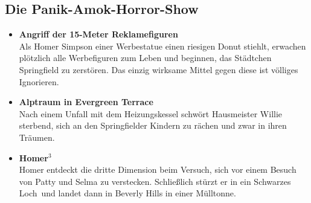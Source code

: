 	
\subsection{Die Panik-Amok-Horror-Show}\label{3F04}
\begin{itemize}
	\item \textbf{Angriff der 15-Meter Reklamefiguren}\\ Als Homer Simpson einer Werbestatue einen riesigen Donut stiehlt, erwachen plötzlich alle Werbefiguren zum Leben und beginnen, das Städt\-chen Springfield zu zerstören. Das einzig wirksame Mittel gegen diese ist völliges Ignorieren.
	\item \textbf{Alptraum in Evergreen Terrace}\\  Nach einem Unfall mit dem Heizungskessel schwört Hausmeister Willie sterbend, sich an den Springfielder Kindern zu rächen und zwar in ihren Träumen.
	\item \textbf{Homer$^3$}\\ Homer entdeckt die dritte Dimension beim Versuch, sich vor einem Besuch von Patty und Selma zu verstecken. Schließlich stürzt er in ein \glqq Schwarzes Loch\grqq\ und landet dann in Beverly Hills in einer Mülltonne.
\end{itemize}

